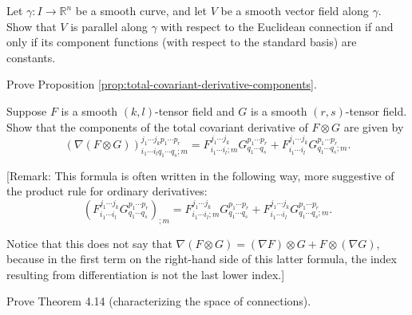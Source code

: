 \begin{exercise}\label{exer:parallel-vector-field-euclidean-connection}
Let $\gamma : I \to \mathbb{R}^n$ be a smooth curve, and let $V$ be a smooth vector field along $\gamma$. Show that $V$ is parallel along $\gamma$ with respect to the Euclidean connection if and only if its component functions (with respect to the standard basis) are constants.
\end{exercise}

\begin{exercise}
\label{exer:prove-proposition-4-18}
Prove Proposition \ref{prop:total-covariant-derivative-components}.
\end{exercise}

\begin{exercise}
\label{exer:tensor-product-covariant-derivative}
Suppose $F$ is a smooth $(k,l)$-tensor field and $G$ is a smooth $(r,s)$-tensor field. Show that the components of the total covariant derivative of $F \otimes G$ are given by
\[
(\nabla(F \otimes G))^{j_1\cdots j_k p_1\cdots p_r}_{i_1\cdots i_l q_1\cdots q_s;m} = F^{j_1\cdots j_k}_{i_1\cdots i_l;m} G^{p_1\cdots p_r}_{q_1\cdots q_s} + F^{j_1\cdots j_k}_{i_1\cdots i_l} G^{p_1\cdots p_r}_{q_1\cdots q_s;m}.
\]

[Remark: This formula is often written in the following way, more suggestive of the product rule for ordinary derivatives:
\[
\left(F^{j_1\cdots j_k}_{i_1\cdots i_l} G^{p_1\cdots p_r}_{q_1\cdots q_s}\right)_{;m} = F^{j_1\cdots j_k}_{i_1\cdots i_l;m} G^{p_1\cdots p_r}_{q_1\cdots q_s} + F^{j_1\cdots j_k}_{i_1\cdots i_l} G^{p_1\cdots p_r}_{q_1\cdots q_s;m}.
\]

Notice that this does not say that $\nabla(F \otimes G) = (\nabla F) \otimes G + F \otimes (\nabla G)$, because in the first term on the right-hand side of this latter formula, the index resulting from differentiation is not the last lower index.]
\end{exercise}

\begin{exercise}\label{prob:characterizing-connections}
Prove Theorem 4.14 (characterizing the space of connections).
\end{exercise}

